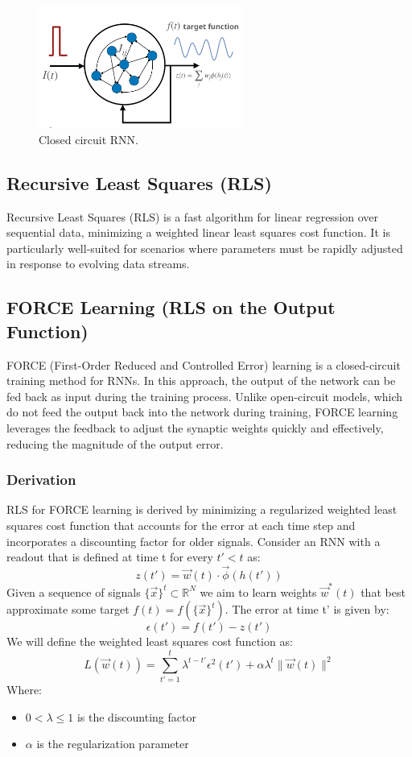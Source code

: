 \documentclass[11pt]{book} %
\begin{document}
\begin{figure}[ht]
\centering
\includegraphics[width=0.6\textwidth]{Figs/RNN_closed_circuit.jpeg}
\caption{Closed circuit RNN.}
\label{fig:rnn_learning}
\end{figure}

\subsection{Recursive Least Squares (RLS)}
Recursive Least Squares (RLS) is a fast algorithm for linear regression over sequential data, 
minimizing a weighted linear least squares cost function. 
It is particularly well-suited for scenarios where parameters must be rapidly adjusted in response to evolving data streams.

\subsection{FORCE Learning (RLS on the Output Function)}
FORCE (First-Order Reduced and Controlled Error) learning is a closed-circuit training method for RNNs. 
In this approach, the output of the network can be fed back as input during the training process. 
Unlike open-circuit models, which do not feed the output back into the network during training,
FORCE learning leverages the feedback to adjust the synaptic weights quickly and effectively, reducing the magnitude of the output error. 

\subsubsection{Derivation}
RLS for FORCE learning is derived by minimizing a regularized weighted least squares cost function that accounts for the error at each time step 
and incorporates a discounting factor for older signals.
Consider an RNN with a readout that is defined at time t for every $t' < t$ as:
\[
    z(t') = \vec{w}(t) \cdot \vec{\phi} (h(t'))
\]
Given a sequence of signals $\{\vec{x}\}^t \subset \mathbb{R}^N$ we aim to learn weights $\vec{w}^*(t)$ that best approximate some target $f(t) = f(\{\vec{x}\}^t)$.
The error at time t' is given by:
\[
    \epsilon(t') = f(t') - z(t')
\]
We will define the weighted least squares cost function as:
\[
    L(\vec{w}(t)) = \sum_{t'=1}^t \lambda^{t-t'} \epsilon^2(t') + \alpha \lambda^t \lVert \vec{w}(t) \rVert^2
\]
Where:
\begin{itemize}
    \item $0 < \lambda \leq 1$ is the discounting factor
    \item $\alpha$ is the regularization parameter
\end{itemize}
\end{document}
